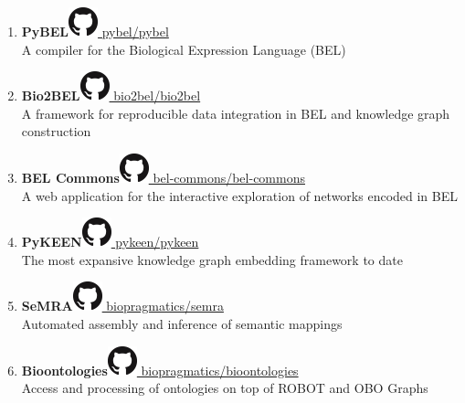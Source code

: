 \documentclass[10pt,a4paper,sans]{moderncv} %
\begin{document}
    \begin{enumerate}
    \itemsep0.5em
        \item \textbf{PyBEL}\hfill\href{https://github.com/pybel/pybel}{\includegraphics[scale=0.25]{img/GitHub-Mark-32px} pybel/pybel}
\\
    A compiler for the Biological Expression Language (BEL)

        \item \textbf{Bio2BEL}\hfill\href{https://github.com/bio2bel/bio2bel}{\includegraphics[scale=0.25]{img/GitHub-Mark-32px} bio2bel/bio2bel}
\\
    A framework for reproducible data integration in BEL and knowledge graph construction

        \item \textbf{BEL Commons}\hfill\href{https://github.com/bel-commons/bel-commons}{\includegraphics[scale=0.25]{img/GitHub-Mark-32px} bel-commons/bel-commons}
\\
    A web application for the interactive exploration of networks encoded in BEL

        \item \textbf{PyKEEN}\hfill\href{https://github.com/pykeen/pykeen}{\includegraphics[scale=0.25]{img/GitHub-Mark-32px} pykeen/pykeen}
\\
    The most expansive knowledge graph embedding framework to date

        \item \textbf{SeMRA}\hfill\href{https://github.com/biopragmatics/semra}{\includegraphics[scale=0.25]{img/GitHub-Mark-32px} biopragmatics/semra}
\\
    Automated assembly and inference of semantic mappings

        \item \textbf{Bioontologies}\hfill\href{https://github.com/biopragmatics/bioontologies}{\includegraphics[scale=0.25]{img/GitHub-Mark-32px} biopragmatics/bioontologies}
\\
    Access and processing of ontologies on top of ROBOT and OBO Graphs


\end{enumerate}
\end{document}
